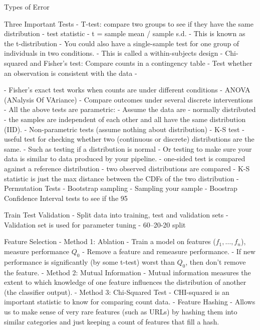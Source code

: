 \documentclass[3pt,landscape]{article}
\begin{document}
\begin{multicols}{3}
Types of Error


Three Important Tests
- T-test: compare two groups to see if they have the same distribution
  - test statistic -  t = sample mean / sample s.d.
  - This is known as the t-distribution
  - You could also have a single-sample test for one group of individuals in two conditions.
  - This is called a within-subjects design
- Chi-squared and Fisher’s test: Compare counts in a contingency table
  - Test whether an observation is consistent with the data
  - 

  - Fisher’s exact test works when counts are under different conditions
- ANOVA (ANalysis Of VAriance) 
  - Compare outcomes under several discrete interventions
- All the above tests are parametric: 
  - Assume the data are 
    - normally distributed
    - the samples are independent of each other and all have the same distribution (IID). 
- Non-parametric tests (assume nothing about distribution)
  - K-S test
    - useful test for checking whether two (continuous or discrete) distributions are the same. 
      - Such as testing if a distribution is normal
      - Or testing to make sure your data is similar to data produced by your pipeline. 
    - one-sided test is compared against a reference distribution
    - two observed distributions are compared
    - K-S statistic is just the max distance between the CDFs of the two distribution
  - Permutation Tests
  - Bootstrap sampling
    - Sampling your sample
    - Boostrap Confidence Interval tests to see if the 95%

Train Test Validation
- Split data into training, test and validation sets
  - Validation set is used for parameter tuning
  - 60–20-20 split

Feature Selection
- Method 1: Ablation
  - Train a model on features ($f_1,…, f_n$), measure performance $Q_0$ 
  - Remove a feature and remeasure performance. 
  - If new performance is significantly (by some t-test) worst than $Q_0$, then don’t remove the feature. 
- Method 2: Mutual Information
  - Mutual information measures the extent to which knowledge of one feature influences the distribution of another (the classifier output).
- Method 3: Chi-Squared Test 
  - CHI-squared is an important statistic to know for comparing count data.  
- Feature Hashing 
  - Allows us to make sense of very rare features (such as URLs) by hashing them into similar categories and just keeping a count of features that fill a hash. 
  


\end{multicols}
\end{document}
